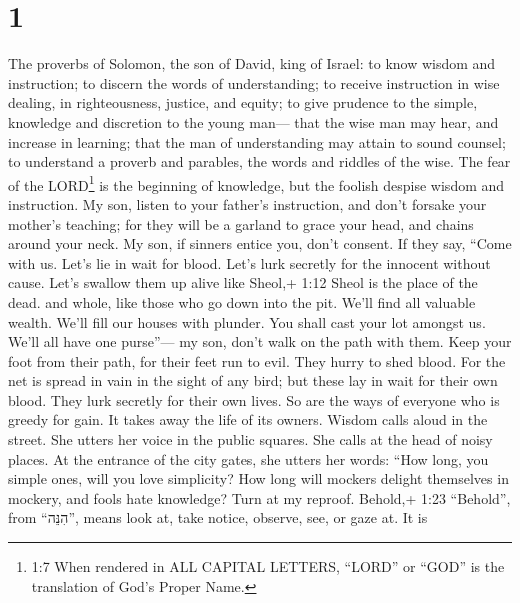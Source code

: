 \hypertarget{section}{%
\section{1}\label{section}}

 The proverbs of Solomon, the son of David, king of Israel:
 to know wisdom and instruction; to discern the words of
understanding;  to receive instruction in wise dealing, in
righteousness, justice, and equity;  to give prudence to the
simple, knowledge and discretion to the young man---  that
the wise man may hear, and increase in learning; that the man of
understanding may attain to sound counsel;  to understand a
proverb and parables, the words and riddles of the wise. 
The fear of the LORD\footnote{1:7 When rendered in ALL CAPITAL LETTERS,
  ``LORD'' or ``GOD'' is the translation of God's Proper Name.} is the
beginning of knowledge, but the foolish despise wisdom and instruction.
 My son, listen to your father's instruction, and don't
forsake your mother's teaching;  for they will be a garland
to grace your head, and chains around your neck.  My son,
if sinners entice you, don't consent.  If they say, ``Come
with us. Let's lie in wait for blood. Let's lurk secretly for the
innocent without cause.  Let's swallow them up alive like
Sheol,+ 1:12 Sheol is the place of the dead. and whole, like those who
go down into the pit.  We'll find all valuable wealth.
We'll fill our houses with plunder.  You shall cast your
lot amongst us. We'll all have one purse''---  my son,
don't walk on the path with them. Keep your foot from their path,
 for their feet run to evil. They hurry to shed blood.
 For the net is spread in vain in the sight of any bird;
 but these lay in wait for their own blood. They lurk
secretly for their own lives.  So are the ways of everyone
who is greedy for gain. It takes away the life of its owners.
 Wisdom calls aloud in the street. She utters her voice in
the public squares.  She calls at the head of noisy places.
At the entrance of the city gates, she utters her words: 
``How long, you simple ones, will you love simplicity? How long will
mockers delight themselves in mockery, and fools hate knowledge?
 Turn at my reproof. Behold,+ 1:23 ``Behold'', from
``הִנֵּה'', means look at, take notice, observe, see, or gaze at. It is
